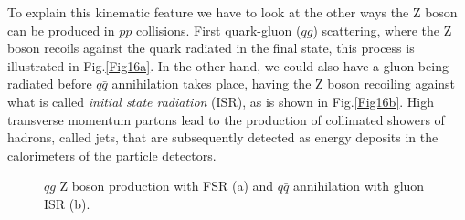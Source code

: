 To explain this kinematic feature we have to look at the other ways the Z boson can be produced in $pp$ collisions. First quark-gluon ($qg$) scattering, where the Z boson recoils against the quark radiated in the final state, this process is illustrated in Fig.\ref{Fig16a}. In the other hand, we could also have a gluon being radiated before $q\bar{q}$ annihilation takes place, having the Z boson recoiling against what is called \textit{initial state radiation} (ISR), as is shown in Fig.\ref{Fig16b}. High transverse momentum partons lead to the production of collimated showers of hadrons, called jets, that are subsequently detected as energy deposits in the calorimeters of the particle detectors. 
\begin{figure}[ht]
	\centering
	\hfill
	\caption{$qg$ Z boson production with FSR (a) and $q\bar{q}$ annihilation with gluon ISR (b).}
	\label{Fig16}
\end{figure}
